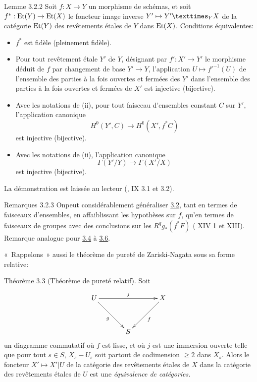 \documentclass[10pt]{../fichiers-configuration-latex/smfart}
\begin{document}
\begin{enonce*}{Lemme 3.2.2}
Soit $f:X\rightarrow Y$ un morphisme de schémas, et soit
$f^{\ast}:\operatorname{Et}(Y)\rightarrow \operatorname{Et}(X)$ le foncteur image inverse
$Y'\mapsto \fprod{Y'}{X}{Y}$ de la catégorie $\operatorname{Et}(Y)$ des revêtements
étales de $Y$ dans $\operatorname{Et}(X)$. Conditions équivalentes:
\begin{itemize}
\item[(i)] $f^{\ast}$ est fidèle (\resp pleinement fidèle).

\item[(ii)] Pour tout revêtement étale $Y'$ de $Y$, désignant par
  $f':X'\rightarrow Y'$ le morphisme déduit de $f$ par changement de
  base $Y'\rightarrow Y$, l'application $U\mapsto {f'}^{-1}(U)$ de
  l'ensemble des parties à la fois ouvertes et fermées des $Y'$ dans
  l'ensemble des parties à la fois ouvertes et fermées de $X'$ est
  injective (\resp bijective).

\item[(ii bis)] Avec les notations de {\rm(ii)}, pour tout faisceau
  d'ensembles constant $C$ sur $Y'$, l'application canonique
$$
H^{0}(Y',C)\longrightarrow H^{0}(X',f^{\ast}C)
$$
est injective (\resp bijective).

\item[(iii)] Avec les notations de {\rm(ii)}, l'application canonique
$$
\Gamma(Y'/Y)\longrightarrow \Gamma(X'/X)
$$
est injective (\resp bijective).
\end{itemize}
\end{enonce*}

La démonstration est laissée au lecteur (\cf {}, IX 3.1 et 3.2).

\begin{enonce*}[remark]{Remarques 3.2.3}
On\pageoriginale peut considérablement généraliser \hyperref[XVI.prop3.2]{3.2}, tant en termes
de faisceaux d'ensembles, en affaiblissant les hypothèses sur $f$,
qu'en termes de faisceaux de groupes avec des conclusions sur les
$R^{q}g_{\ast}(f^{\ast}F)$ (\cf {} XIV 1 et  XIII). Remarque
analogue pour \hyperref[XVI.cor3.4]{3.4} à \hyperref[XVI.cor3.6]{3.6}.
\end{enonce*}

« Rappelons »  aussi le théorème de pureté de Zariski-Nagata
sous sa forme relative:

\begin{enonce*}{Théorème 3.3}
(Théorème de pureté relatif). Soit
$$
\xymatrix@=1.25cm{
U \ar[rr]^{j} \ar[rd]_{g}&     &X\ar[ld]^{f}\\
  & S   &
}
$$
un diagramme commutatif où $f$ est lisse, et où $j$ est une immersion
ouverte telle que pour tout $s\in S$, $X_s-U_s$ soit partout de
codimension $\geq 2$ dans $X_s$. Alors le foncteur $X'\mapsto X'|U$ de
la catégorie des revêtements étales de $X$ dans la catégorie des
revêtements étales de $U$ est une \emph{équivalence de catégories.}
\end{enonce*}
\end{document}
